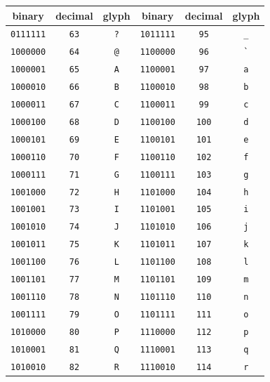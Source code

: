 \begin{table}[!htbp]
\centering
\begin{tabular}{|ccc|ccc|} \hline
binary         & decimal   & glyph    & binary & decimal & glyph \\\hline\hline
\verb!0111111! & \verb!63! & \verb!?! & \verb!1011111! & \verb!95!  & \verb!_! \\
\verb!1000000! & \verb!64! & \verb!@! & \verb!1100000! & \verb!96!  & \verb!`! \\
\verb!1000001! & \verb!65! & \verb!A! & \verb!1100001! & \verb!97!  & \verb!a! \\
\verb!1000010! & \verb!66! & \verb!B! & \verb!1100010! & \verb!98!  & \verb!b! \\
\verb!1000011! & \verb!67! & \verb!C! & \verb!1100011! & \verb!99!  & \verb!c! \\
\verb!1000100! & \verb!68! & \verb!D! & \verb!1100100! & \verb!100! & \verb!d! \\
\verb!1000101! & \verb!69! & \verb!E! & \verb!1100101! & \verb!101! & \verb!e! \\
\verb!1000110! & \verb!70! & \verb!F! & \verb!1100110! & \verb!102! & \verb!f! \\
\verb!1000111! & \verb!71! & \verb!G! & \verb!1100111! & \verb!103! & \verb!g! \\
\verb!1001000! & \verb!72! & \verb!H! & \verb!1101000! & \verb!104! & \verb!h! \\
\verb!1001001! & \verb!73! & \verb!I! & \verb!1101001! & \verb!105! & \verb!i! \\
\verb!1001010! & \verb!74! & \verb!J! & \verb!1101010! & \verb!106! & \verb!j! \\
\verb!1001011! & \verb!75! & \verb!K! & \verb!1101011! & \verb!107! & \verb!k! \\
\verb!1001100! & \verb!76! & \verb!L! & \verb!1101100! & \verb!108! & \verb!l! \\
\verb!1001101! & \verb!77! & \verb!M! & \verb!1101101! & \verb!109! & \verb!m! \\
\verb!1001110! & \verb!78! & \verb!N! & \verb!1101110! & \verb!110! & \verb!n! \\
\verb!1001111! & \verb!79! & \verb!O! & \verb!1101111! & \verb!111! & \verb!o! \\
\verb!1010000! & \verb!80! & \verb!P! & \verb!1110000! & \verb!112! & \verb!p! \\
\verb!1010001! & \verb!81! & \verb!Q! & \verb!1110001! & \verb!113! & \verb!q! \\
\verb!1010010! & \verb!82! & \verb!R! & \verb!1110010! & \verb!114! & \verb!r! \\

\end{tabular}
\end{table}
